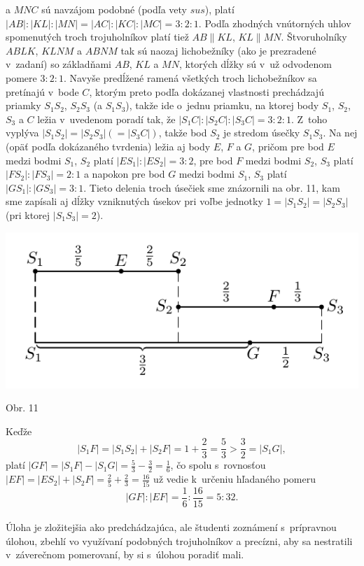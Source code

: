 a $MNC$ sú navzájom podobné (podľa vety $sus$), platí $|AB| : |KL| : |MN| = |AC| : |KC| : |MC| = 3 : 2 : 1$. Podľa zhodných vnútorných uhlov spomenutých troch trojuholníkov platí tiež $AB \parallel KL$, $KL \parallel MN$. Štvoruholníky $ABLK$, $KLNM$ a $ABNM$ tak sú naozaj lichobežníky (ako je prezradené v~zadaní) so základňami $AB$, $KL$ a $MN$, ktorých dĺžky sú v~už odvodenom pomere $3 : 2 : 1$. Navyše predĺžené ramená všetkých troch lichobežníkov sa pretínajú v~bode $C$, ktorým preto podľa dokázanej vlastnosti prechádzajú priamky $S_1 S_2$, $S_2 S_3$ (a $S_1 S_3$), takže ide o~jednu priamku, na ktorej body $S_1$, $S_2$, $S_3$ a $C$ ležia v~uvedenom poradí tak, že $|S_1 C| : |S_2 C| : |S_3 C| = 3 : 2 : 1$. Z~toho vyplýva $|S_1 S_2 | = |S_2 S_3 | (= |S_3 C|)$, takže bod $S_2$ je stredom úsečky $S_1 S_3$. Na nej (opäť podľa dokázaného tvrdenia) ležia aj body $E$, $F$ a $G$, pričom pre bod $E$ medzi bodmi $S_1$, $S_2$ platí $|ES_1 | : |ES_2 | = 3 : 2$, pre bod $F$ medzi bodmi $S_2$, $S_3$ platí $|FS_2| : |FS_3| = 2 : 1$ a napokon pre bod $G$ medzi bodmi $S_1$, $S_3$ platí $|GS_1| : |GS_3 | = 3 : 1$. Tieto delenia troch úsečiek sme znázornili na obr. 11, kam sme zapísali aj dĺžky vzniknutých úsekov pri voľbe jednotky $1 = |S_1 S_2 | = |S_2 S_3 |$ (pri ktorej $|S_1 S_3 | = 2$).
\begin{center}
\includegraphics{obrazky/66D53}

Obr. 11
\end{center}
Keďže
$$|S_1 F| = |S_1 S_2 | + |S_2 F| = 1 +\frac{2}{3}=\frac{5}{3}>\frac{3}{2}= |S_1 G|,$$
platí $|GF| = |S_1 F| - |S_1 G| =\frac{5}{3} -\frac{3}{2}=\frac{1}{6}$, čo spolu s~rovnosťou $|EF| = |ES_2 | + |S_2 F|=\frac{2}{5}+\frac{2}{3}=\frac{16}{15}$ už vedie k~určeniu hľadaného pomeru
$$|GF| : |EF| =\frac{1}{6}:\frac{16}{15}= 5 : 32.$$
\\
\kom Úloha je zložitejšia ako predchádzajúca, ale študenti zoznámení s~prípravnou úlohou, zbehlí vo využívaní podobných trojuholníkov a precízni, aby sa nestratili v~záverečnom pomerovaní, by si s~úlohou poradiť mali.
